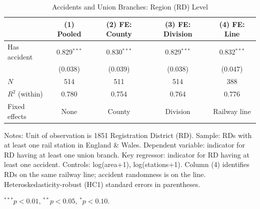\begin{table}[htbp]
\centering
\caption{Accidents and Union Branches: Region (RD) Level}
\label{tab:rd_level}
\begin{tabular}{lcccc}
\toprule
 & (1) Pooled & (2) FE: County & (3) FE: Division & (4) FE: Line \\
\midrule
Has accident & 0.829$^{***}$ & 0.830$^{***}$ & 0.829$^{***}$ & 0.832$^{***}$ \\
 & (0.038) & (0.039) & (0.038) & (0.047) \\
\midrule
\(N\) & 514 & 511 & 514 & 388 \\
\(R^2\) (within) & 0.780 & 0.754 & 0.764 & 0.776 \\
\midrule
Fixed effects & None & County & Division & Railway line \\
\bottomrule
\end{tabular}
\begin{tablenotes}
\small
\item Notes: Unit of observation is 1851 Registration District (RD). Sample: RDs with at least one rail station in England \& Wales. Dependent variable: indicator for RD having at least one union branch. Key regressor: indicator for RD having at least one accident. Controls: log(area+1), log(stations+1). Column (4) identifies RDs on the same railway line; accident randomness is on the line. Heteroskedasticity-robust (HC1) standard errors in parentheses.
\item $^{***}p<0.01$, $^{**}p<0.05$, $^{*}p<0.10$.
\end{tablenotes}
\end{table}

